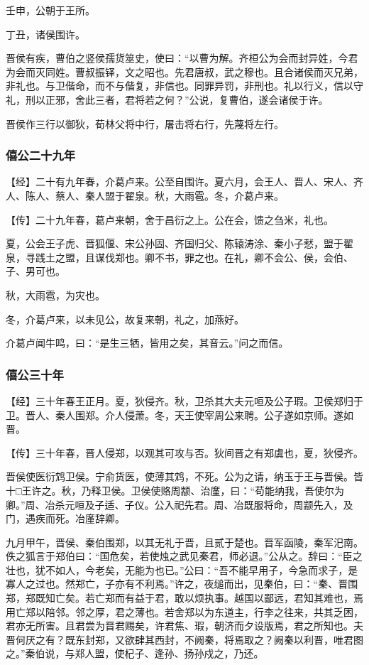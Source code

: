 \documentclass[]{article}
\begin{document}
壬申，公朝于王所。

丁丑，诸侯围许。

晋侯有疾，曹伯之竖侯孺货筮史，使曰：``以曹为解。齐桓公为会而封异姓，今君为会而灭同姓。曹叔振铎，文之昭也。先君唐叔，武之穆也。且合诸侯而灭兄弟，非礼也。与卫偕命，而不与偕复，非信也。同罪异罚，非刑也。礼以行义，信以守礼，刑以正邪，舍此三者，君将若之何？''公说，复曹伯，遂会诸侯于许。

晋侯作三行以御狄，荀林父将中行，屠击将右行，先蔑将左行。

\hypertarget{header-n990}{%
\subsubsection{僖公二十九年}\label{header-n990}}

【经】二十有九年春，介葛卢来。公至自围许。夏六月，会王人、晋人、宋人、齐人、陈人、蔡人、秦人盟于翟泉。秋，大雨雹。冬，介葛卢来。

【传】二十九年春，葛卢来朝，舍于昌衍之上。公在会，馈之刍米，礼也。

夏，公会王子虎、晋狐偃、宋公孙固、齐国归父、陈辕涛涂、秦小子憖，盟于翟泉，寻践土之盟，且谋伐郑也。卿不书，罪之也。在礼，卿不会公、侯，会伯、子、男可也。

秋，大雨雹，为灾也。

冬，介葛卢来，以未见公，故复来朝，礼之，加燕好。

介葛卢闻牛鸣，曰：``是生三牺，皆用之矣，其音云。''问之而信。

\hypertarget{header-n999}{%
\subsubsection{僖公三十年}\label{header-n999}}

【经】三十年春王正月。夏，狄侵齐。秋，卫杀其大夫元咺及公子瑕。卫侯郑归于卫。晋人、秦人围郑。介人侵萧。冬，天王使宰周公来聘。公子遂如京师。遂如晋。

【传】三十年春，晋人侵郑，以观其可攻与否。狄间晋之有郑虞也，夏，狄侵齐。

晋侯使医衍鸩卫侯。宁俞货医，使薄其鸩，不死。公为之请，纳玉于王与晋侯。皆十□王许之。秋，乃释卫侯。卫侯使赂周颛、治廑，曰：``苟能纳我，吾使尔为卿。''周、冶杀元咺及子适、子仪。公入祀先君。周、冶既服将命，周颛先入，及门，遇疾而死。冶廑辞卿。

九月甲午，晋侯、秦伯围郑，以其无礼于晋，且贰于楚也。晋军函陵，秦军汜南。佚之狐言于郑伯曰：``国危矣，若使烛之武见秦君，师必退。''公从之。辞曰：``臣之壮也，犹不如人，今老矣，无能为也已。''公曰：``吾不能早用子，今急而求子，是寡人之过也。然郑亡，子亦有不利焉。''许之，夜缒而出，见秦伯，曰：``秦、晋围郑，郑既知亡矣。若亡郑而有益于君，敢以烦执事。越国以鄙远，君知其难也，焉用亡郑以陪邻。邻之厚，君之薄也。若舍郑以为东道主，行李之往来，共其乏困，君亦无所害。且君尝为晋君赐矣，许君焦、瑕，朝济而夕设版焉，君之所知也。夫晋何厌之有？既东封郑，又欲肆其西封，不阙秦，将焉取之？阙秦以利晋，唯君图之。''秦伯说，与郑人盟，使杞子、逢孙、扬孙戍之，乃还。
\end{document}
